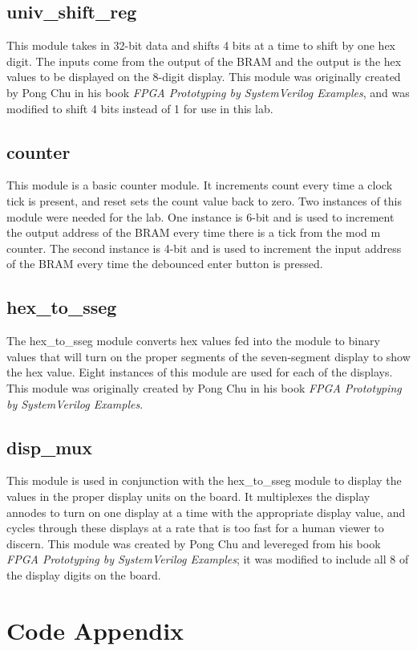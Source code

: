 \documentclass{article}
\newcommand{\Verilog}[3]{
  \lstset{language=Verilog}
  \lstset{backgroundcolor=\color{listinggray},rulecolor=\color{blue}}
  \lstset{linewidth=\textwidth}
  \lstset{commentstyle=\textit, stringstyle=\upshape,showspaces=false}
  \lstset{frame=tb}
  
}
\begin{document}
\subsection{univ\_shift\_reg}
This module takes in 32-bit data and shifts 4 bits at a time to shift by one hex digit. The inputs come from the output of the BRAM and the output is the hex values to be displayed on the 8-digit display. This module was originally created by Pong Chu in his book \textit{FPGA Prototyping by SystemVerilog Examples}, and was modified to shift 4 bits instead of 1 for use in this lab.

\subsection{counter}
This module is a basic counter module. It increments count every time a clock tick is present, and reset sets the count value back to zero. Two instances of this module were needed for the lab. One instance is 6-bit and is used to increment the output address of the BRAM every time there is a tick from the mod m counter. The second instance is 4-bit and is used to increment the input address of the BRAM every time the debounced enter button is pressed. 

\subsection{hex\_to\_sseg}
The hex\_to\_sseg module converts hex values fed into the module to binary values that will turn on the proper segments of the seven-segment display to show the hex value. Eight instances of this module are used for each of the displays. This module was originally created by Pong Chu in his book \textit{FPGA Prototyping by SystemVerilog Examples}.

\subsection{disp\_mux}
This module is used in conjunction with the hex\_to\_sseg module to display the values in the proper display units on the board. It multiplexes the display annodes to turn on one display at a time with the appropriate display value, and cycles through these displays at a rate that is too fast for a human viewer to discern. This module was created by Pong Chu and levereged from his book \textit{FPGA Prototyping by SystemVerilog Examples}; it was modified to include all 8 of the display digits on the board.


\section{Code Appendix}
\Verilog{Verilog code for implementing the scrolling display.}{code:scrolling_display}{../scrolling_display/scrolling_display.sv}
\end{document}
